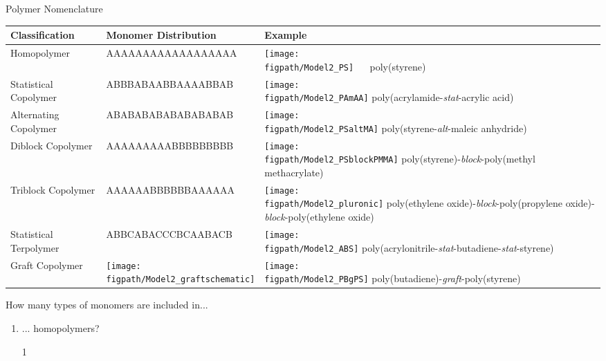 \begin{activity}{Polymer Nomenclature}
\begin{model}[Composition]
	{\renewcommand{\arraystretch}{1.75}
	\begin{tabular}{m{0.78in}m{2in}m{2.5in}}
		\hline
		Classification & Monomer Distribution & Example\\
		\hline
		Homopolymer & AAAAAAAAAAAAAAAAAA & \texttt{[image: \\figpath/Model2\_PS]} ~~ poly(styrene) \\\hline
		Statistical Copolymer & ABBBABAABBAAAABBAB & \texttt{[image: \\figpath/Model2\_PAmAA]} \newline poly(acrylamide-\emph{stat}-acrylic acid)\\\hline
		Alternating Copolymer & ABABABABABABABABAB & \texttt{[image: \\figpath/Model2\_PSaltMA]} \newline poly(styrene-\emph{alt}-maleic anhydride)\\\hline
		Diblock Copolymer & AAAAAAAAABBBBBBBBB & \texttt{[image: \\figpath/Model2\_PSblockPMMA]} \newline poly(styrene)-\emph{block}-poly(methyl methacrylate)\\\hline
		Triblock Copolymer & AAAAAABBBBBBAAAAAA & \texttt{[image: \\figpath/Model2\_pluronic]} \newline poly(ethylene oxide)-\emph{block}-poly(propyl\-ene oxide)-\emph{block}-poly(ethylene oxide) \\\hline
		Statistical Terpolymer & ABBCABACCCBCAABACB & \texttt{[image: \\figpath/Model2\_ABS]} \newline poly(acrylonitrile-\emph{stat}-butadiene-\emph{stat}-styrene) \\\hline
		Graft Copolymer & \texttt{[image: \\figpath/Model2\_graftschematic]} & \texttt{[image: \\figpath/Model2\_PBgPS]} \newline poly(butadiene)-\emph{graft}-poly(styrene) 
	\end{tabular}
	}

\end{model}

\begin{ctqs}

	\question How many types of monomers are included in...
	
		\begin{enumerate}
			\item ... homopolymers?
			
				\begin{solution}[0.25in]
				1
				\end{solution}
			

\end{enumerate}
\end{ctqs}
\end{activity}
